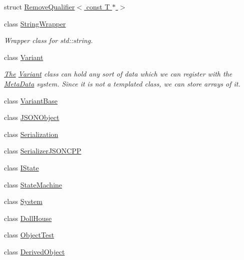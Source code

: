 \begin{DoxyCompactItemize}
struct \hyperlink{structDCEngine_1_1RemoveQualifier_3_01const_01T_01_5_01_4}{Remove\-Qualifier$<$ const T $\ast$ $>$}
\item 
class \hyperlink{classDCEngine_1_1StringWrapper}{String\-Wrapper}
\begin{DoxyCompactList}\small\item\em Wrapper class for std\-::string. \end{DoxyCompactList}\item 
class \hyperlink{classDCEngine_1_1Variant}{Variant}
\begin{DoxyCompactList}\small\item\em \hyperlink{classThe}{The} \hyperlink{classDCEngine_1_1Variant}{Variant} class can hold any sort of data which we can register with the \hyperlink{classDCEngine_1_1MetaData}{Meta\-Data} system. Since it is not a templated class, we can store arrays of it. \end{DoxyCompactList}\item 
class \hyperlink{classDCEngine_1_1VariantBase}{Variant\-Base}
\item 
class \hyperlink{classDCEngine_1_1JSONObject}{J\-S\-O\-N\-Object}
\item 
class \hyperlink{classDCEngine_1_1Serialization}{Serialization}
\item 
class \hyperlink{classDCEngine_1_1SerializerJSONCPP}{Serializer\-J\-S\-O\-N\-C\-P\-P}
\item 
class \hyperlink{classDCEngine_1_1IState}{I\-State}
\item 
class \hyperlink{classDCEngine_1_1StateMachine}{State\-Machine}
\item 
class \hyperlink{classDCEngine_1_1System}{System}
\item 
class \hyperlink{classDCEngine_1_1DollHouse}{Doll\-House}
\item 
class \hyperlink{classDCEngine_1_1ObjectTest}{Object\-Test}
\item 
class \hyperlink{classDCEngine_1_1DerivedObject}{Derived\-Object}
\end{DoxyCompactItemize}
